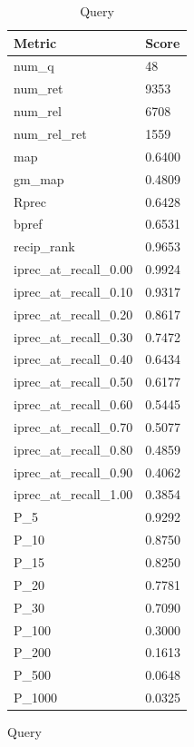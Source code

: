 
\begin{table}[htb]
    \parbox{.45\linewidth}{
    \begin{tabular}{ | l | l | }
    \hline
    Metric & Score \\ \hline
	num\_q & 48 \\ \hline
	num\_ret & 9353 \\ \hline
	num\_rel & 6708 \\ \hline
	num\_rel\_ret & 1559 \\ \hline
	map & 0.6400 \\ \hline
	gm\_map & 0.4809 \\ \hline
	Rprec & 0.6428 \\ \hline
	bpref & 0.6531 \\ \hline
	recip\_rank & 0.9653 \\ \hline
	iprec\_at\_recall\_0.00 & 0.9924 \\ \hline
	iprec\_at\_recall\_0.10 & 0.9317 \\ \hline
	iprec\_at\_recall\_0.20 & 0.8617 \\ \hline
	iprec\_at\_recall\_0.30 & 0.7472 \\ \hline
	iprec\_at\_recall\_0.40 & 0.6434 \\ \hline
	iprec\_at\_recall\_0.50 & 0.6177 \\ \hline
	iprec\_at\_recall\_0.60 & 0.5445 \\ \hline
	iprec\_at\_recall\_0.70 & 0.5077 \\ \hline
	iprec\_at\_recall\_0.80 & 0.4859 \\ \hline
	iprec\_at\_recall\_0.90 & 0.4062 \\ \hline
	iprec\_at\_recall\_1.00 & 0.3854 \\ \hline
	P\_5 & 0.9292 \\ \hline
	P\_10 & 0.8750 \\ \hline
	P\_15 & 0.8250 \\ \hline
	P\_20 & 0.7781 \\ \hline
	P\_30 & 0.7090 \\ \hline
	P\_100 & 0.3000 \\ \hline
	P\_200 & 0.1613 \\ \hline
	P\_500 & 0.0648 \\ \hline
	P\_1000 & 0.0325 \\ \hline
    \end{tabular}
    \caption{Query}
    \label{table:manual-query}
    }
    \parbox{.45\linewidth}{
    \begin{tabular}{ | l | l | }

\end{tabular}}
\end{table}
